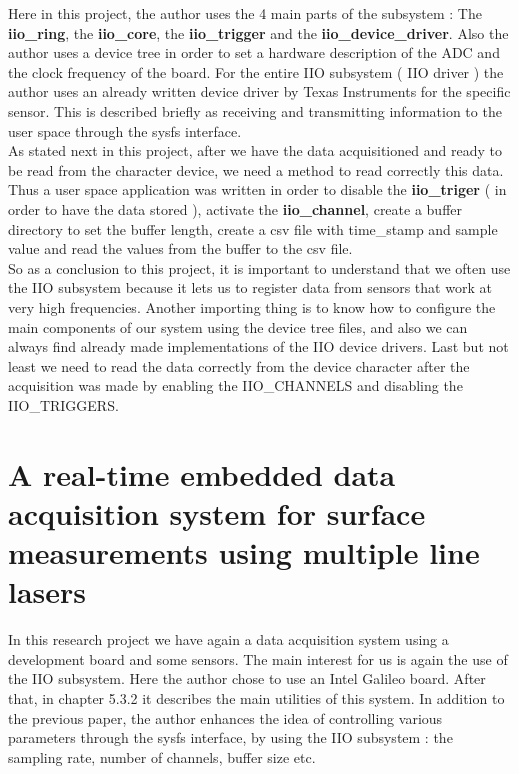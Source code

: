 \documentclass[l2pt, letterpaper]{article}
\begin{document}
Here in this project, the author uses the 4 main parts of the subsystem : The
\textbf{iio\_ring}, the \textbf{iio\_core}, the \textbf{iio\_trigger} and the \textbf{iio\_device\_driver}. 
Also the author uses a device tree in order to set a hardware description of the ADC and the
clock frequency of the board. For the entire IIO subsystem ( IIO driver ) the
author uses an already written device driver by Texas Instruments for the
specific sensor. This is described briefly as receiving and transmitting
information to the user space through the sysfs interface.\\

As stated next in this project, after we have the data acquisitioned and ready to
be read from the character device, we need a method to read correctly this data.
Thus a user space application was written in order to disable the \textbf{iio\_triger} ( in
order to have the data stored ), activate the \textbf{iio\_channel}, create a buffer directory
to set the buffer length, create a csv file with time\_stamp and sample value and
read the values from the buffer to the csv file. \\

So as a conclusion to this project, it is important to understand that we often use
the IIO subsystem because it lets us to register data from sensors that work at
very high frequencies. Another importing thing is to know how to configure the
main components of our system using the device tree files, and also we can
always find already made implementations of the IIO device drivers. Last but not
least we need to read the data correctly from the device character after the
acquisition was made by enabling the IIO\_CHANNELS and disabling the
IIO\_TRIGGERS.

\section{A real-time embedded data acquisition system for surface measurements using multiple line lasers}

In this research project we have again a data acquisition system using a
development board and some sensors. The main interest for us is again the use
of the IIO subsystem. Here the author chose to use an Intel Galileo board. After
that, in chapter 5.3.2 it describes the main utilities of this system. In addition to
the previous paper, the author enhances the idea of controlling various
parameters through the sysfs interface, by using the IIO subsystem : the
sampling rate, number of channels, buffer size etc. \\
\end{document}
